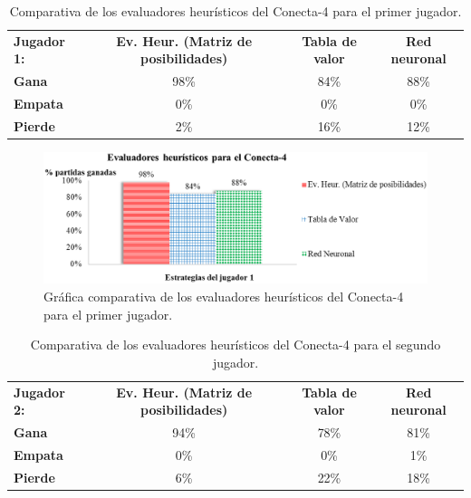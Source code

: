 \begin{table}[!h]
\centering
\caption[Comparativa de los evaluadores heurísticos del Conecta-4 (I)]{Comparativa de los evaluadores heurísticos del Conecta-4 para el primer jugador.}
\label{tab:comparativa_heuristicos_conecta4_jug1}
\begin{tabular}{lccc}
\hline
\textbf{Jugador 1:} & \textbf{Ev. Heur. (Matriz de posibilidades)} & \textbf{Tabla de valor} & \textbf{Red neuronal} \\
\textbf{Gana} & 98\% & 84\% & 88\% \\
\textbf{Empata} & 0\% & 0\% & 0\% \\
\textbf{Pierde} & 2\% & 16\% & 12\% \\
\hline
\end{tabular}
\end{table} 

\begin{figure}[!h]
	\centering
	\includegraphics[scale=0.3]{contenido/cap7/imagenes/heuristicosConecta4jug1.eps}
	\caption[Comparativa de los evaluadores heurísticos del Conecta-4 (I)]{Gráfica comparativa de los evaluadores heurísticos del Conecta-4 para el primer jugador.}
	\label{fig:comparativa_heuristicos_conecta4_jug1}
\end{figure}

\begin{table}[!h]
\centering
\caption[Comparativa de los evaluadores heurísticos del Conecta-4 (II)]{Comparativa de los evaluadores heurísticos del Conecta-4 para el segundo jugador.}
\label{tab:comparativa_heuristicos_conecta4_jug2}
\begin{tabular}{lccc}
\hline
\textbf{Jugador 2:} & \textbf{Ev. Heur. (Matriz de posibilidades)} & \textbf{Tabla de valor} & \textbf{Red neuronal} \\
\textbf{Gana} & 94\% & 78\% & 81\% \\
\textbf{Empata} & 0\% & 0\% & 1\% \\
\textbf{Pierde} & 6\% & 22\% & 18\% \\
\hline
\end{tabular}
\end{table} 

